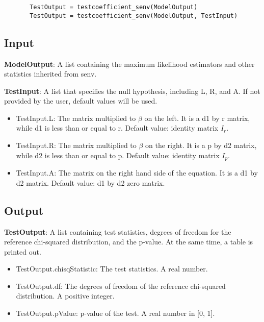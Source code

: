 \documentclass[a4paper,11pt,openany]{memoir}
\begin{document}
\begin{verbatim}       TestOutput = testcoefficient_senv(ModelOutput)
       TestOutput = testcoefficient_senv(ModelOutput, TestInput)\end{verbatim}
    

\subsection*{Input}

\begin{par}
\textbf{ModelOutput}: A list containing the maximum likelihood estimators and other statistics inherited from senv.
\end{par} \vspace{1em}
\begin{par}
\textbf{TestInput}: A list that specifies the null hypothesis, including L, R, and A.  If not provided by the user, default values will be used.
\end{par} \vspace{1em}
\begin{itemize}
\setlength{\itemsep}{-1ex}
   \item TestInput.L: The matrix multiplied to $\beta$ on the left.  It is a d1 by r matrix, while d1 is less than or equal to r.  Default value: identity matrix $I_r$.
   \item TestInput.R: The matrix multiplied to $\beta$ on the right.  It is a p by d2 matrix, while d2 is less than or equal to p.  Default value: identity matrix $I_p$.
   \item TestInput.A: The matrix on the right hand side of the equation.  It is a d1 by d2 matrix.  Default value: d1 by d2 zero matrix.
\end{itemize}


\subsection*{Output}

\begin{par}
\textbf{TestOutput}: A list containing test statistics, degrees of freedom for the reference chi-squared distribution, and the p-value.  At the same time, a table is printed out.
\end{par} \vspace{1em}
\begin{itemize}
\setlength{\itemsep}{-1ex}
   \item TestOutput.chisqStatistic: The test statistics. A real number.
   \item TestOutput.df: The degrees of freedom of the reference chi-squared distribution.  A positive integer.
   \item TestOutput.pValue: p-value of the test.  A real number in [0, 1].
\end{itemize}
\end{document}
